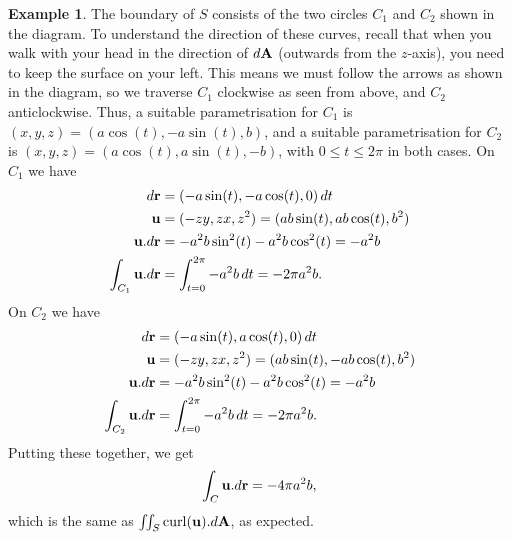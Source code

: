\documentclass[reqno]{amsart}
\theoremstyle{definition}
\newtheorem{example}[theorem]{Example}
\begin{document}
\begin{example}
 The boundary of $S$ consists of the two circles $C_1$ and $C_2$ shown
 in the diagram.  To understand the direction of these curves, recall
 that when you walk with your head in the direction of $d\mathbf{A}$
 (outwards from the $z$-axis), you need to keep the surface on your
 left.  This means we must follow the arrows as shown in the diagram,
 so we traverse $C_1$ clockwise as seen from above, and $C_2$
 anticlockwise.  Thus, a suitable parametrisation for $C_1$ is
 $(x,y,z)=(a\cos(t),-a\sin(t),b)$, and a suitable parametrisation for
 $C_2$ is $(x,y,z)=(a\cos(t),a\sin(t),-b)$, with $0\leq t\leq 2\pi$ in
 both cases.  On $C_1$ we have
 \begin{align*}
  d\mathbf{r} &= (-a\sin(t),-a\cos(t),0)\,dt \\
  \mathbf{u} &= (-zy,zx,z^2) = (ab\sin(t),ab\cos(t),b^2) \\
  \mathbf{u}.d\mathbf{r} &= -a^2b\sin^2(t)-a^2b\cos^2(t) = -a^2b \\
  \int_{C_1}\mathbf{u}.d\mathbf{r} &= \int_{t=0}^{2\pi} -a^2b\,dt = -2\pi a^2b.
 \end{align*}
 On $C_2$ we have
 \begin{align*}
  d\mathbf{r} &= (-a\sin(t),a\cos(t),0)\,dt \\
  \mathbf{u} &= (-zy,zx,z^2) = (ab\sin(t),-ab\cos(t),b^2) \\
  \mathbf{u}.d\mathbf{r} &= -a^2b\sin^2(t)-a^2b\cos^2(t) = -a^2b \\
  \int_{C_2}\mathbf{u}.d\mathbf{r} &= \int_{t=0}^{2\pi} -a^2b\,dt = -2\pi a^2b.
 \end{align*}
 Putting these together, we get
 \[ \int_C \mathbf{u}.d\mathbf{r} = -4\pi a^2b, \]
 which is the same as $\iint_S\operatorname{curl}(\mathbf{u}).d\mathbf{A}$, as expected.
\end{example}
\end{document}
